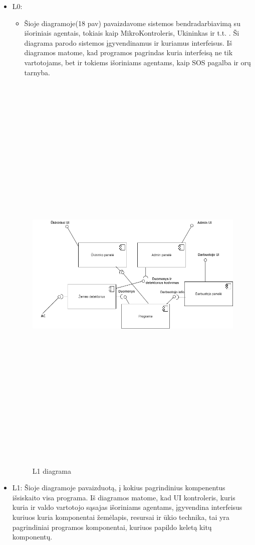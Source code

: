 \documentclass[oneside]{VUMIFPSkursinis}
\begin{document}
	\begin{itemize}
	\item L0:
	\begin{itemize}
	\item Šioje diagramoje(18 pav) pavaizdavome sistemos bendradarbiavimą su išoriniais agentais, tokiais kaip MikroKontroleris, Ukininkas ir t.t. . Ši diagrama parodo sistemos įgyvendinamus ir kuriamus interfeisus. Iš diagramos matome, kad programos pagrindas kuria interfeisą ne tik vartotojams, bet ir tokiems išoriniams agentams, kaip SOS pagalba ir orų tarnyba.
\end{itemize}
	\begin{figure}[H]
		\centering	
	\includegraphics[width=17cm,height=20cm,keepaspectratio]{L1.png}
	\caption{L1 diagrama}
	\label{fig:L1}
\end{figure}
\item L1: Šioje diagramoje pavaizduotą, į kokius pagrindinius kompenentus išsiskaito visa programa. Iš diagramos matome, kad UI kontroleris, kuris kuria ir valdo vartotojo sąsajas išoriniams agentams, įgyvendina interfeisus kuriuos kuria komponentai žemėlapis, resursai ir ūkio technika, tai yra pagrindiniai programos komponentai, kuriuos papildo keletą kitų komponentų.

\end{itemize}
\pagebreak
\end{document}
